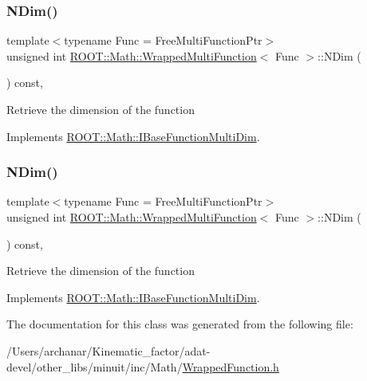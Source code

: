 \subsubsection{\texorpdfstring{NDim()}{NDim()}\hspace{0.1cm}{\footnotesize\ttfamily [2/3]}}
{\footnotesize\ttfamily template$<$typename Func  = Free\+Multi\+Function\+Ptr$>$ \\
unsigned int \mbox{\hyperlink{classROOT_1_1Math_1_1WrappedMultiFunction}{R\+O\+O\+T\+::\+Math\+::\+Wrapped\+Multi\+Function}}$<$ Func $>$\+::N\+Dim (\begin{DoxyParamCaption}{ }\end{DoxyParamCaption}) const\hspace{0.3cm}{\ttfamily [inline]}, {\ttfamily [virtual]}}

Retrieve the dimension of the function 

Implements \mbox{\hyperlink{classROOT_1_1Math_1_1IBaseFunctionMultiDim_a16f37dc7a6d00c75ddeda0697741315d}{R\+O\+O\+T\+::\+Math\+::\+I\+Base\+Function\+Multi\+Dim}}.

\mbox{\label{classROOT_1_1Math_1_1WrappedMultiFunction_a99de9f7a6e26b03b1cdcf35d8c62d761}} 
\subsubsection{\texorpdfstring{NDim()}{NDim()}\hspace{0.1cm}{\footnotesize\ttfamily [3/3]}}
{\footnotesize\ttfamily template$<$typename Func  = Free\+Multi\+Function\+Ptr$>$ \\
unsigned int \mbox{\hyperlink{classROOT_1_1Math_1_1WrappedMultiFunction}{R\+O\+O\+T\+::\+Math\+::\+Wrapped\+Multi\+Function}}$<$ Func $>$\+::N\+Dim (\begin{DoxyParamCaption}{ }\end{DoxyParamCaption}) const\hspace{0.3cm}{\ttfamily [inline]}, {\ttfamily [virtual]}}

Retrieve the dimension of the function 

Implements \mbox{\hyperlink{classROOT_1_1Math_1_1IBaseFunctionMultiDim_a16f37dc7a6d00c75ddeda0697741315d}{R\+O\+O\+T\+::\+Math\+::\+I\+Base\+Function\+Multi\+Dim}}.



The documentation for this class was generated from the following file\+:\begin{DoxyCompactItemize}
\item 
/\+Users/archanar/\+Kinematic\+\_\+factor/adat-\/devel/other\+\_\+libs/minuit/inc/\+Math/\mbox{\hyperlink{adat-devel_2other__libs_2minuit_2inc_2Math_2WrappedFunction_8h}{Wrapped\+Function.\+h}}\end{DoxyCompactItemize}
